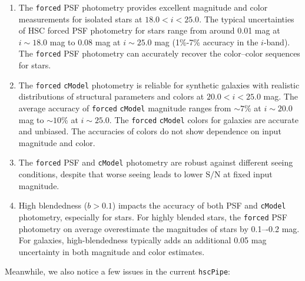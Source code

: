 \documentclass[useamsfonts]{pasj01}
\def\hscpipe{\texttt{hscPipe}}
\def\cmodel{\texttt{cModel}}
\def\forced{\texttt{forced}}
\begin{document}
    \begin{enumerate}

        \item The \forced{} PSF photometry provides excellent magnitude and color
            measurements for isolated stars at $18.0 < i < 25.0$.
            The typical uncertainties of HSC forced PSF photometry for stars range
            from around 0.01 mag at $i{\sim}18.0$ mag to 0.08 mag at $i{\sim}25.0$
            mag (1\%-7\% accuracy in the $i$-band).
            The \forced{} PSF photometry can accurately recover the color--color
            sequences for stars.

        \item The \forced{} \cmodel{} photometry is reliable for synthetic galaxies
            with realistic distributions of structural parameters and colors at
            $20.0 < i < 25.0$ mag.
            The average accuracy of \forced{} \cmodel{} magnitude ranges from
            ${\sim}7$\% at $i{\sim}20.0$ mag to ${\sim}10$\% at $i{\sim}25.0$.
            The \forced{} \cmodel{} colors for galaxies are accurate and unbiased.
            The accuracies of colors do not show dependence on input magnitude and
            color.

        \item The \forced{} PSF and \cmodel{} photometry are robust against different
            seeing conditions, despite that worse seeing leads to lower
            $\mathrm{S}/\mathrm{N}$ at fixed input magnitude.

        \item High blendedness ($b>0.1$) impacts the accuracy of both PSF and \cmodel{}
            photometry, especially for stars.
            For highly blended stars, the \forced{} PSF photometry on average
            overestimate the magnitudes of stars by 0.1–-0.2 mag.
            For galaxies, high-blendedness typically adds an additional 0.05 mag
            uncertainty in both magnitude and color estimates.

    \end{enumerate}

    Meanwhile, we also notice a few issues in the current \hscpipe{}:
\end{document}
